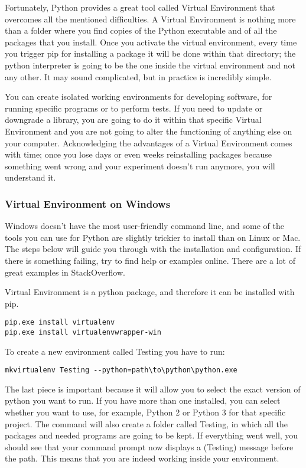 Fortunately, Python provides a great tool called Virtual Environment that overcomes all the mentioned difficulties. A Virtual Environment is nothing more than a folder where you find copies of the Python executable and of all the packages that you install. Once you activate the virtual environment, every time you trigger pip for installing a package it will be done within that directory; the python interpreter is going to be the one inside the virtual environment and not any other. It may sound complicated, but in practice is incredibly simple.

You can create isolated working environments for developing software, for running specific programs or to perform tests. If you need to update or downgrade a library, you are going to do it within that specific Virtual Environment and you are not going to alter the functioning of anything else on your computer. Acknowledging the advantages of a Virtual Environment comes with time; once you lose days or even weeks reinstalling packages because something went wrong and your experiment doesn’t run anymore, you will understand it.

\subsubsection{Virtual Environment on Windows}
Windows doesn’t have the most user-friendly command line, and some of the tools you can use for Python are slightly trickier to install than on Linux or Mac. The steps below will guide you through with the installation and configuration. If there is something failing, try to find help or examples online. There are a lot of great examples in StackOverflow.

Virtual Environment is a python package, and therefore it can be installed with pip.

\begin{verbatim}
pip.exe install virtualenv
pip.exe install virtualenvwrapper-win
\end{verbatim}

To create a new environment called Testing you have to run:

\begin{verbatim}
mkvirtualenv Testing --python=path\to\python\python.exe
\end{verbatim}

The last piece is important because it will allow you to select the exact version of python you want to run. If you have more than one installed, you can select whether you want to use, for example, Python 2 or Python 3 for that specific project. The command will also create a folder called Testing, in which all the packages and needed programs are going to be kept. If everything went well, you should see that your command prompt now displays a (Testing) message before the path. This means that you are indeed working inside your environment.

